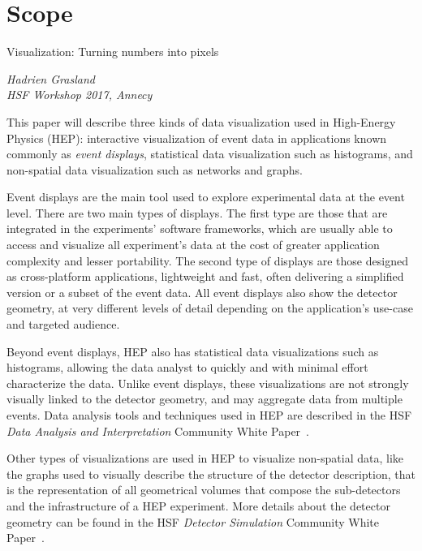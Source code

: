 \documentclass[12pt,a4paper]{article}
\begin{document}
\maketitle

\newpage


\hypertarget{scope}{%
\section{Scope}\label{scope}}

\epigraph{Visualization: Turning numbers into pixels}{\textit{Hadrien Grasland \\ HSF Workshop 2017, Annecy}}

This paper will describe three kinds of data visualization used in High-Energy Physics (HEP): interactive visualization of event data in applications known commonly as \emph{event displays}, statistical data visualization such as histograms, and non-spatial data visualization such as networks and graphs.

Event displays are the main tool used to explore experimental data at the event level.
There are two main types of displays. The first type are those that are integrated in the experiments’ software frameworks,
which are usually able to access and visualize all experiment’s data at the cost of greater application complexity and lesser portability.
The second type of displays are those designed as cross-platform applications, lightweight and fast, often
delivering a simplified version or a subset of the event data. All event displays also show the detector geometry, at very different levels of detail depending on the application's use-case and targeted audience.

Beyond event displays, HEP also has statistical data visualizations such as histograms, allowing the data analyst to quickly
and with minimal effort characterize the data.
Unlike event displays, these visualizations are not strongly visually linked to the detector geometry,
and may aggregate data from multiple events. Data analysis tools and techniques used in HEP are
described in the HSF \textit{Data Analysis and Interpretation} Community White Paper~\cite{HSF-CWP-2017-05}.

Other types of visualizations are used in HEP to
visualize non-spatial data, like the graphs used to visually describe the structure of the detector description, that is 
the representation of all geometrical volumes that compose the sub-detectors and the infrastructure of a HEP experiment.
More details about the detector geometry can be found in the HSF \textit{Detector Simulation} Community White Paper~\cite{HSF-CWP-2017-07}.
\end{document}
